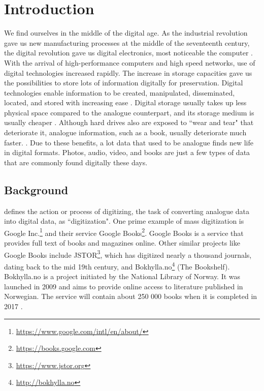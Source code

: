 
\chapter{Introduction}
\label{ch:introduction}
We find ourselves in the middle of the digital age. As the industrial revolution gave us new manufacturing processes at the middle of the seventeenth century, the digital revolution gave us digital electronics, most noticeable the computer \citep{freeman2001time}. With the arrival of high-performance computers and high speed networks, use of digital technologies increased rapidly. The increase in storage capacities gave us the possibilities to store lots of information digitally for preservation. Digital technologies enable information to be created, manipulated, disseminated, located, and stored with increasing ease \citep{lee2002state}. Digital storage usually takes up less physical space compared to the analogue counterpart, and its storage medium is usually cheaper \citep{morris2003evolution}. Although hard drives also are exposed to ``wear and tear" that deteriorate it, analogue information, such as a book, usually deteriorate much faster. . Due to these benefits, a lot data that used to be analogue finds new life in digital formats. Photos, audio, video, and books are just a few types of data that are commonly found digitally these days.


\section{Background}
\citep{misc-oed-digitization} defines the action or process of digitizing, the task of converting analogue data into digital data, as ``digitization". One prime example of mass digitization is Google Inc.\footnote{\url{https://www.google.com/intl/en/about/}} and their service Google Books\footnote{\url{https://books.google.com}}. Google Books is a service that provides full text of books and magazines online. Other similar projects like Google Books include JSTOR\footnote{\url{https://www.jstor.org}}, which has digitized nearly a thousand journals, dating back to the mid 19th century, and Bokhylla.no\footnote{\url{http://bokhylla.no}} (The Bookshelf). Bokhylla.no is a project initiated by the National Library of Norway. It was launched in 2009 and aims to provide online access to literature published in Norwegian. The service will contain about 250 000 books when it is completed in 2017 \citep{misc-nb-digial-library}.

